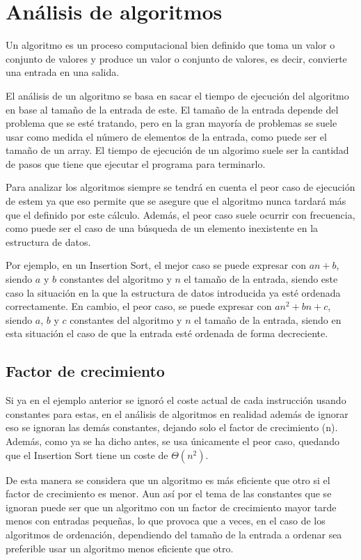 \chapter{Análisis de algoritmos}

Un algoritmo es un proceso computacional bien definido que toma un valor o
conjunto de valores y produce un valor o conjunto de valores, es decir,
convierte una entrada en una salida.

El análisis de un algoritmo se basa en sacar el tiempo de ejecución del
algoritmo en base al tamaño de la entrada de este. El tamaño de la entrada
depende del problema que se esté tratando, pero en la gran mayoría de
problemas se suele usar como medida el número de elementos de la entrada, como
puede ser el tamaño de un array. El tiempo de ejecución de un algorimo suele
ser la cantidad de pasos que tiene que ejecutar el programa para terminarlo.

Para analizar los algoritmos siempre se tendrá en cuenta el peor caso de
ejecución de estem ya que eso permite que se asegure que el algoritmo nunca
tardará más que el definido por este cálculo. Además, el peor caso suele
ocurrir con frecuencia, como puede ser el caso de una búsqueda de un elemento
inexistente en la estructura de datos.


Por ejemplo, en un Insertion Sort, el mejor caso se puede expresar con $an +
b$, siendo $a$ y $b$ constantes del algoritmo y $n$ el tamaño de la entrada,
siendo este caso la situación en la que la estructura de datos introducida ya
esté ordenada correctamente. En cambio, el peor caso, se puede expresar con
$an^2 + bn + c$, siendo $a$, $b$ y $c$ constantes del algoritmo y $n$ el tamaño
de la entrada, siendo en esta situación el caso de que la entrada esté ordenada
de forma decreciente.

\section{Factor de crecimiento}
Si ya en el ejemplo anterior se ignoró el coste actual de cada instrucción
usando constantes para estas, en el análisis de algoritmos en realidad además
de ignorar eso se ignoran las demás constantes, dejando solo el factor de
crecimiento (n). Además, como ya se ha dicho antes, se usa únicamente el peor
caso, quedando que el Insertion Sort tiene un coste de $\Theta(n^2)$.

De esta manera se considera que un algoritmo es más eficiente que otro si el
factor de crecimiento es menor. Aun así por el tema de las constantes que se
ignoran puede ser que un algoritmo con un factor de crecimiento mayor tarde
menos con entradas pequeñas, lo que provoca que a veces, en el caso de los
algoritmos de ordenación, dependiendo del tamaño de la entrada a ordenar sea
preferible usar un algoritmo menos eficiente que otro.


